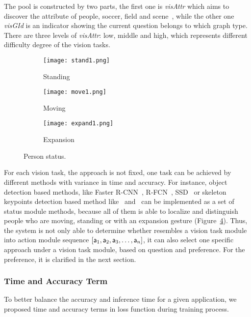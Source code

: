 The pool is constructed by two parts, the first one is \textit{visAttr} which aims to discover the attribute of people, soccer, field and scene~\cite{peixi2019}, while the other one \textit{visGId} is an indicator showing the current question belongs to which graph type. There are three levels of \textit{visAttr}: low, middle and high, which represents different difficulty degree of the vision tasks. 

\begin{figure}[thb]
\centering
        \begin{subfigure}[b]{0.088\textwidth}
                \texttt{[image: stand1.png]}
                \caption{Standing}
                \label{fig:gull}
        \end{subfigure}\quad
        \begin{subfigure}[b]{0.127\textwidth}
                \texttt{[image: move1.png]}
                \caption{Moving}
                \label{fig:gull2}
        \end{subfigure}\quad
        \begin{subfigure}[b]{0.166\textwidth}
                \texttt{[image: expand1.png]}
                \caption{Expansion}
                \label{fig:tiger}
        \end{subfigure}
        \caption{Person status.}\label{fig:Person Status}
\end{figure}

For each vision task, the approach is not fixed, one task can be achieved by different methods with variance in time and accuracy. For instance, object detection based methods, like Faster R-CNN~\cite{Ren:2015:FRT:2969239.2969250}, R-FCN~\cite{DBLP:conf/nips/DaiLHS16}, SSD~\cite{DBLP:conf/eccv/LiuAESRFB16} or skeleton keypoints detection based method like~\cite{cao2017realtime} and~\cite{wei2016cpm} can be implemented as a set of status module methods, because all of them is able to localize and distinguish people who are moving, standing or with an expansion gesture (Figure~\ref{fig:Person Status}). Thus, the system is not only able to determine whether resembles a vision task module into action module sequence $[{\mathsf{a}}_1,{\mathsf{a}}_2,{\mathsf{a}}_3,\dots,{\mathsf{a}}_n]$, it can also select one specific approach under a vision task module, based on question and preference. For the preference, it is clarified in the next section.


\subsubsection{Time and Accuracy Term}
\label{sec-TimeAcc}
\hspace{\parindent} To better balance the accuracy and inference time for a given application, we proposed time and accuracy terms in loss function during training process.

